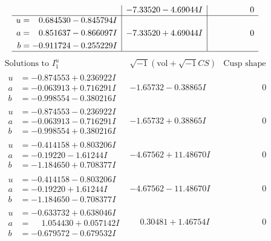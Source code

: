 \documentclass[1p]{elsarticle_modified}
\theoremstyle{definition}
\newcommand{\I}{\sqrt{-1}}
\begin{document}
$$\begin{array}{c|c|c}
 & -7.33520 - 4.69044 I & \phantom{-0.000000 } 0 \\ \hline\begin{aligned}
u &= \phantom{-}0.684530 - 0.845794 I \\
a &= \phantom{-}0.851637 - 0.866097 I \\
b &= -0.911724 - 0.255229 I\end{aligned}
 & -7.33520 + 4.69044 I & \phantom{-0.000000 } 0\\
 \hline 
 \end{array}$$\newpage$$\begin{array}{c|c|c}  
\text{Solutions to }I^u_{1}& \I (\text{vol} + \sqrt{-1}CS) & \text{Cusp shape}\\
 \hline 
\begin{aligned}
u &= -0.874553 + 0.236922 I \\
a &= -0.063913 + 0.716291 I \\
b &= -0.998554 - 0.380216 I\end{aligned}
 & -1.65732 - 0.38865 I & \phantom{-0.000000 } 0 \\ \hline\begin{aligned}
u &= -0.874553 - 0.236922 I \\
a &= -0.063913 - 0.716291 I \\
b &= -0.998554 + 0.380216 I\end{aligned}
 & -1.65732 + 0.38865 I & \phantom{-0.000000 } 0 \\ \hline\begin{aligned}
u &= -0.414158 + 0.803206 I \\
a &= -0.19220 - 1.61244 I \\
b &= -1.184650 + 0.708377 I\end{aligned}
 & -4.67562 + 11.48670 I & \phantom{-0.000000 } 0 \\ \hline\begin{aligned}
u &= -0.414158 - 0.803206 I \\
a &= -0.19220 + 1.61244 I \\
b &= -1.184650 - 0.708377 I\end{aligned}
 & -4.67562 - 11.48670 I & \phantom{-0.000000 } 0 \\ \hline\begin{aligned}
u &= -0.633732 + 0.638046 I \\
a &= \phantom{-}1.054430 + 0.057142 I \\
b &= -0.679572 - 0.679532 I\end{aligned}
 & \phantom{-}0.30481 + 1.46754 I & \phantom{-0.000000 } 0 \\ \hline\begin{aligned}

\end{aligned}
\end{array}$$
\end{document}
